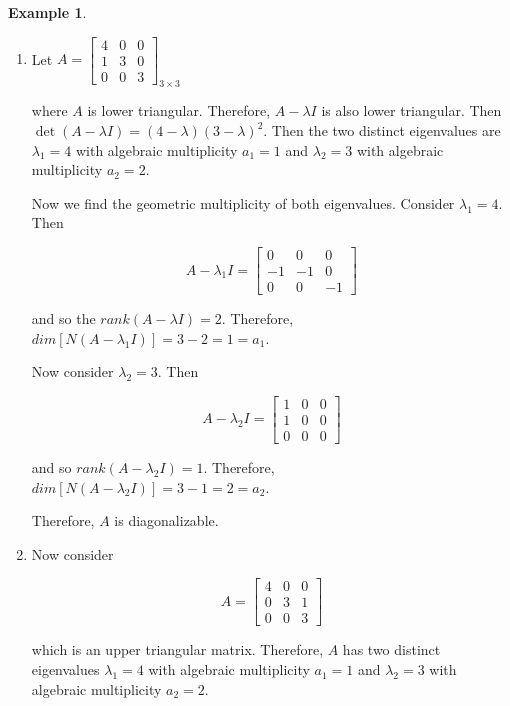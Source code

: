 \documentclass[12pt]{article}
\theoremstyle{definition}
\newtheorem*{example}{Example}
\begin{document}
\begin{example} $ $

\begin{enumerate}[label = (\arabic*)]

\item Let $A = \begin{bmatrix} 4 & 0 & 0 \\ 1 & 3 & 0 \\ 0 & 0 & 3 \end{bmatrix}_{3 \times 3}$


where $A$ is lower triangular. Therefore, $A - \lambda I$ is also lower triangular. Then
$\det (A - \lambda I) = (4 - \lambda)(3 - \lambda)^2$. Then the two distinct eigenvalues
are $\lambda_1 = 4$ with algebraic multiplicity $a_1 = 1$ and $\lambda_2 = 3$ with
algebraic multiplicity $a_2 = 2$.

Now we find the geometric multiplicity of both eigenvalues. Consider $\lambda_1 = 4$. Then

\[A - \lambda_1 I =
\begin{bmatrix}
0 & 0 & 0 \\
-1 & -1 & 0 \\
0 & 0 & -1
\end{bmatrix}
\]

and so the $rank(A - \lambda I) = 2$. Therefore, $dim[N(A - \lambda_1 I)] = 3 - 2 = 1 = a_1$.

Now consider $\lambda_2 = 3$. Then

\[
A - \lambda_2 I =
\begin{bmatrix}
1 & 0 & 0 \\
1 & 0 & 0 \\
0 & 0 & 0
\end{bmatrix}
\]

and so $rank(A - \lambda_2 I) = 1$. Therefore, $dim[N(A - \lambda_2 I)] = 3 - 1 = 2 = a_2$.

Therefore, $A$ is diagonalizable.

\item Now consider

\[A =
\begin{bmatrix}
4 & 0 & 0 \\
0 & 3 & 1 \\
0 & 0 & 3
\end{bmatrix}
\]
 
which is an upper triangular matrix. Therefore, $A$ has two distinct eigenvalues $\lambda_1 = 4$
with algebraic multiplicity $a_1 = 1$ and $\lambda_2 = 3$ with algebraic multiplicity
$a_2 = 2$.


\end{enumerate}
\end{example}
\end{document}
